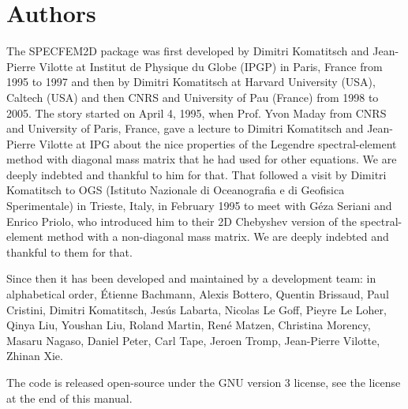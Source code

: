 \section*{Authors}

The SPECFEM2D package was first developed by Dimitri
Komatitsch and Jean-Pierre Vilotte at Institut de Physique du Globe
(IPGP) in Paris, France from 1995 to 1997 and then by Dimitri Komatitsch
at Harvard University (USA), Caltech (USA) and then CNRS and University of Pau (France) from 1998 to 2005.
The story started on April 4, 1995, when Prof. Yvon Maday from CNRS and University of Paris, France, gave a lecture to
Dimitri Komatitsch and Jean-Pierre Vilotte at IPG about the nice properties of the Legendre spectral-element method with diagonal mass matrix that he had used for
other equations. We are deeply indebted and thankful to him for that.
That followed a visit by Dimitri Komatitsch to OGS (Istituto Nazionale di Oceanografia e di Geofisica Sperimentale) in Trieste, Italy, in February 1995
to meet with G\'eza Seriani and Enrico Priolo, who introduced him to their 2D Chebyshev version of the spectral-element method with a non-diagonal mass matrix.
We are deeply indebted and thankful to them for that.\newline

Since then it has been developed and maintained by a development team: in alphabetical order,
\'Etienne Bachmann,
Alexis Bottero,
Quentin Brissaud,
Paul Cristini,
Dimitri Komatitsch,
Jes\'us Labarta,
Nicolas Le Goff,
Pieyre Le Loher,
Qinya Liu,
Youshan Liu,
Roland Martin,
Ren\'e Matzen,
Christina Morency,
Masaru Nagaso,
Daniel Peter,
Carl Tape,
Jeroen Tromp,
Jean-Pierre Vilotte,
Zhinan Xie.\newline

The code is released open-source under the GNU version 3 license, see the license at the end of this manual.

